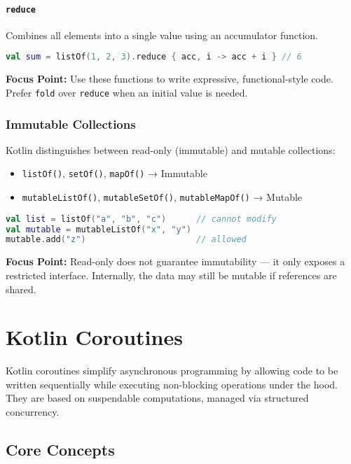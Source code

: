 \documentclass[a4paper,12pt]{article}
\begin{document}
\paragraph{\texttt{reduce}}  
Combines all elements into a single value using an accumulator function.
\begin{lstlisting}[language=Kotlin]
val sum = listOf(1, 2, 3).reduce { acc, i -> acc + i } // 6
\end{lstlisting}

\textbf{Focus Point:} Use these functions to write expressive, functional-style code. Prefer \texttt{fold} over \texttt{reduce} when an initial value is needed.

\subsubsection{Immutable Collections}

Kotlin distinguishes between read-only (immutable) and mutable collections:

\begin{itemize}
  \item \texttt{listOf()}, \texttt{setOf()}, \texttt{mapOf()} → Immutable
  \item \texttt{mutableListOf()}, \texttt{mutableSetOf()}, \texttt{mutableMapOf()} → Mutable
\end{itemize}

\begin{lstlisting}[language=Kotlin]
val list = listOf("a", "b", "c")      // cannot modify
val mutable = mutableListOf("x", "y")
mutable.add("z")                      // allowed
\end{lstlisting}

\textbf{Focus Point:} Read-only does not guarantee immutability — it only exposes a restricted interface. Internally, the data may still be mutable if references are shared.


\section{Kotlin Coroutines}

Kotlin coroutines simplify asynchronous programming by allowing code to be written sequentially while executing non-blocking operations under the hood. They are based on suspendable computations, managed via structured concurrency.

\subsection{Core Concepts}
\end{document}
